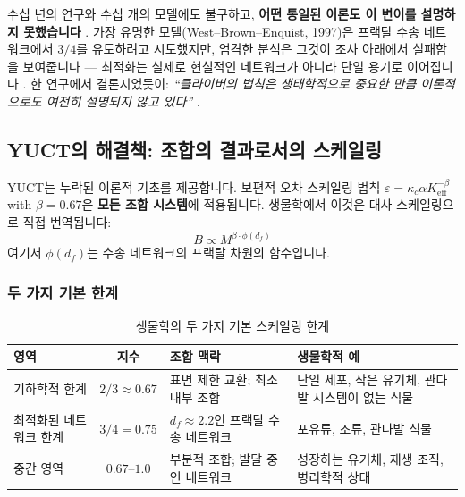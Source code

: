 \documentclass[11pt,a4paper]{article}
\newcommand{\Keff}{K_{\mathrm{eff}}}
\begin{document}
	수십 년의 연구와 수십 개의 모델에도 불구하고, \textbf{어떤 통일된 이론도 이 변이를 설명하지 못했습니다} \cite{Agutter2004}. 가장 유명한 모델(West–Brown–Enquist, 1997)은 프랙탈 수송 네트워크에서 \(3/4\)를 유도하려고 시도했지만, 엄격한 분석은 그것이 조사 아래에서 실패함을 보여줍니다 — 최적화는 실제로 현실적인 네트워크가 아니라 단일 용기로 이어집니다 \cite{Dodds2001}. 한 연구에서 결론지었듯이: \textit{``클라이버의 법칙은 생태학적으로 중요한 만큼 이론적으로도 여전히 설명되지 않고 있다''} \cite{Agutter2004}.
	
	\subsection{YUCT의 해결책: 조합의 결과로서의 스케일링}
	
	YUCT는 누락된 이론적 기초를 제공합니다. 보편적 오차 스케일링 법칙 \(\varepsilon = \kappa_c \alpha \Keff^{-\beta}\) with \(\beta = 0.67\)은 \textbf{모든 조합 시스템}에 적용됩니다. 생물학에서 이것은 대사 스케일링으로 직접 번역됩니다:
	\begin{equation}
		B \propto M^{\beta \cdot \phi(d_f)}
	\end{equation}
	여기서 \(\phi(d_f)\)는 수송 네트워크의 프랙탈 차원의 함수입니다.
	
	\subsubsection{두 가지 기본 한계}
	
	\begin{table}[htbp]
		\centering
		\caption{생물학의 두 가지 기본 스케일링 한계}
		\label{tab:scaling-limits}
		\begin{tabular}{p{3.5cm}c p{6cm} p{5cm}}
			\toprule
			\textbf{영역} & \textbf{지수} & \textbf{조합 맥락} & \textbf{생물학적 예} \\
			\midrule
			기하학적 한계 & \(2/3 \approx 0.67\) & 표면 제한 교환; 최소 내부 조합 & 단일 세포, 작은 유기체, 관다발 시스템이 없는 식물 \cite{Glazier2005,Reich2006} \\
			최적화된 네트워크 한계 & \(3/4 = 0.75\) & \(d_f \approx 2.2\)인 프랙탈 수송 네트워크 & 포유류, 조류, 관다발 식물 \cite{West1997} \\
			중간 영역 & \(0.67\)–\(1.0\) & 부분적 조합; 발달 중인 네트워크 & 성장하는 유기체, 재생 조직, 병리학적 상태 \cite{Glazier2005} \\
			\bottomrule
		\end{tabular}
	\end{table}
	
\end{document}
